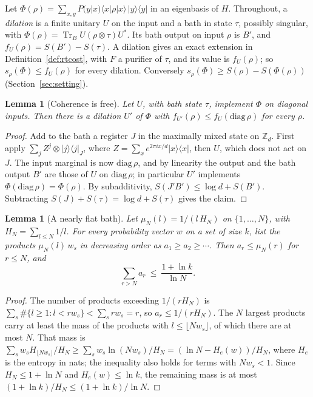 \documentclass[11pt]{article}
\newtheorem{lemma}[theorem]{Lemma}
\theoremstyle{definition}
\theoremstyle{remark}
\newcommand{\Tr}{\operatorname{Tr}}
\begin{document}
Let $\Phi(\rho)=\sum_{x,y}P(y|x)\langle x|\rho|x\rangle\,|y\rangle\langle y|$ in an eigenbasis of $H$. Throughout, a \emph{dilation} is a finite unitary $U$ on the input and a bath in state $\tau$, possibly singular, with $\Phi(\rho)=\Tr_BU(\rho\otimes\tau)U^*$. Its bath output on input $\rho$ is $B'$, and $f_U(\rho)=S(B')-S(\tau)$. A dilation gives an exact extension in Definition~\ref{def:rtcost}, with $F$ a purifier of $\tau$, and its value is $f_U(\rho)$; so $s_\rho(\Phi)\le f_U(\rho)$ for every dilation. Conversely $s_\rho(\Phi)\ge S(\rho)-S(\Phi(\rho))$ (Section~\ref{sec:setting}).

\begin{lemma}[Coherence is free]\label{lem:dephase}
Let $U$, with bath state $\tau$, implement $\Phi$ on diagonal inputs. Then there is a dilation $U'$ of $\Phi$ with $f_{U'}(\rho)\le f_U(\mathrm{diag}\,\rho)$ for every $\rho$.
\end{lemma}

\begin{proof}
Add to the bath a register $J$ in the maximally mixed state on $\mathbb Z_d$. First apply $\sum_j Z^j\otimes|j\rangle\langle j|_J$, where $Z=\sum_x e^{2\pi ix/d}|x\rangle\langle x|$, then $U$, which does not act on $J$. The input marginal is now $\mathrm{diag}\,\rho$, and by linearity the output and the bath output $B'$ are those of $U$ on $\mathrm{diag}\,\rho$; in particular $U'$ implements $\Phi(\mathrm{diag}\,\rho)=\Phi(\rho)$. By subadditivity, $S(J'B')\le\log d+S(B')$. Subtracting $S(J)+S(\tau)=\log d+S(\tau)$ gives the claim.
\end{proof}

\begin{lemma}[A nearly flat bath]\label{lem:loguniform}
Let $\mu_N(l)=1/(l\,H_N)$ on $\{1,\dots,N\}$, with $H_N=\sum_{l\le N}1/l$. For every probability vector $w$ on a set of size $k$, list the products $\mu_N(l)\,w_s$ in decreasing order as $a_1\ge a_2\ge\cdots$. Then $a_r\le\mu_N(r)$ for $r\le N$, and
\[
\sum_{r>N}a_r\ \le\ \frac{1+\ln k}{\ln N}.
\]
\end{lemma}

\begin{proof}
The number of products exceeding $1/(rH_N)$ is $\sum_s\#\{l\ge1:l<rw_s\}<\sum_s rw_s=r$, so $a_r\le1/(rH_N)$. The $N$ largest products carry at least the mass of the products with $l\le\lfloor Nw_s\rfloor$, of which there are at most $N$. That mass is $\sum_sw_sH_{\lfloor Nw_s\rfloor}/H_N\ge\sum_sw_s\ln(Nw_s)/H_N=(\ln N-H_e(w))/H_N$, where $H_e$ is the entropy in nats; the inequality also holds for terms with $Nw_s<1$. Since $H_N\le1+\ln N$ and $H_e(w)\le\ln k$, the remaining mass is at most $(1+\ln k)/H_N\le(1+\ln k)/\ln N$.
\end{proof}
\end{document}
